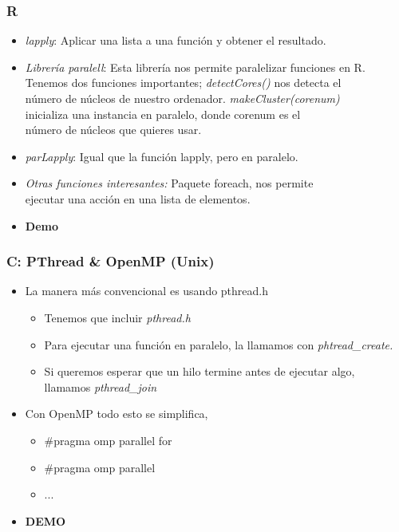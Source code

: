 \documentclass[aspectratio=169]{beamer}
\begin{document}
\begin{frame}
	\frametitle{R}
	
	\begin{itemize}
		\item \textit{lapply}: \pause Aplicar una lista a una función y obtener el resultado.
		\pause
		\item \textit{Librería paralell}: \pause Esta librería nos permite paralelizar funciones en R. \pause \\Tenemos dos funciones importantes; \textit{detectCores()} nos detecta el \\número de núcleos de nuestro ordenador. \pause\textit{makeCluster(corenum)} \\inicializa una instancia en paralelo, donde corenum es el \\número de núcleos que quieres usar.
		\item \textit{parLapply}: Igual que la función lapply, pero en paralelo.
		\item \textit{Otras funciones interesantes:} Paquete foreach, nos permite\\ejecutar una acción en una lista de elementos.
		\item \textbf{Demo}
	\end{itemize}
\end{frame}

\begin{frame}
	\frametitle{C: PThread \& OpenMP (Unix)}
	
	\pause
	\begin{itemize}
		\item La manera más convencional es usando pthread.h \pause
		
		\begin{itemize}
			\item Tenemos que incluir \textit{pthread.h} \pause
			\item Para ejecutar una función en paralelo, la llamamos con \textit{phtread\_create.}
			\item Si queremos esperar que un hilo termine antes de ejecutar algo, \\llamamos \textit{pthread\_join}
		\end{itemize}
	
		\item Con OpenMP todo esto se simplifica, \pause
		\begin{itemize}
			\item \#pragma omp parallel for\pause
			\item \#pragma omp parallel
			\item ...\pause
		\end{itemize}
	
		\item \textbf{DEMO}
	\end{itemize}
	
\end{frame}
\end{document}
